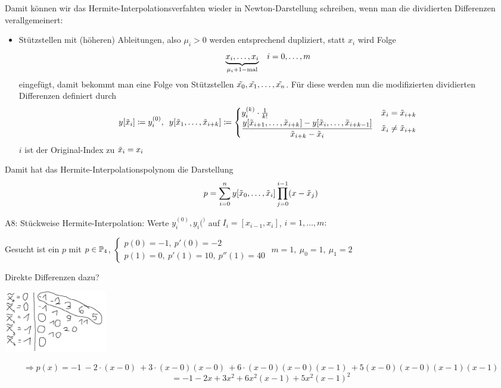 \documentclass[../Skript.tex]{subfiles}
\begin{document}
Damit können wir das Hermite-Interpolationsverfahten wieder in Newton-Darstellung schreiben, wenn man die dividierten 
Differenzen verallgemeinert:\\
\newcommand{\tx}{\Tilde{x}}
\begin{itemize}
    \item Stützstellen mit (höheren) Ableitungen, also $\mu_i > 0$ werden entsprechend dupliziert, statt $x_i$ wird Folge
    \[\underset{\mu_i + 1-\text{mal}}{\underbrace{x_i, \dots, x_i}}\hspace{1em} i=0,\dots, m\]eingefügt, damit bekommt man 
    eine Folge von Stützstellen $\Tilde{x_0}, \Tilde{x_1}, \dots, \Tilde{x_n}$. Für diese werden nun die modifizierten 
    dividierten Differenzen definiert durch \[
    y[\tx_i] \coloneqq y_i^{(0)}, \midspace y[\tx_1, \dots , \tx_{i+k}] \coloneqq \begin{cases}
        y_i^{(k)}\cdot \frac{1}{k!} & \tx_i = \tx_{i+k}\\
        \displaystyle\frac{y[\tx_{i+1}, \dots, \tx_{i+k}] - y[\tx_i, \dots, \tx_{i+k-1}]}{\tx_{i+k} - \tx_i} & \tx_i \neq 
        \tx_{i+k}
    \end{cases}
    \]
    $i$ ist der Original-Index zu $\tx_i = x_i$
\end{itemize}
\begin{theorem}
    Damit hat das Hermite-Interpolationspolynom die Darstellung \[
    p=\sum_{i=0}^n y[\tx_0, \dots, \tx_i] \prod_{j=0}^{i-1}(x-\tx_j)
    \]
\end{theorem}

A8: Stückweise Hermite-Interpolation: Werte $y^{(0)}_i,y_i{(^)}$ auf $I_i=[x_{i-1},x_i]$, $i=1,\dots,m: $
\begin{example}
    Gesucht ist ein $p$ mit $p\in\mathbb{P}_4$, $\begin{cases}
        p(0)=-1, \ p'(0)= -2\\
        p(1)=0, \ p'(1)=10, \ p''(1)=40
    \end{cases}$
    $m=1,\ \mu_0=1, \ \mu_1=2$
\end{example}
Direkte Differenzen dazu?\\
\begin{center}
        \includegraphics[width=45mm]{../Bilder/x_3.png}\\
\end{center}
\[
\Rightarrow p(x)= -1\ -2\cdot(x-0)\ +3\cdot(x-0)(x-0)\ +6\cdot(x-0)(x-0)(x-1) \ +5(x-0)(x-0)(x-1)(x-1)\]
\[=-1-2x+3x^2+6x^2(x-1)+5x^2(x-1)^2
\]
\end{document}
